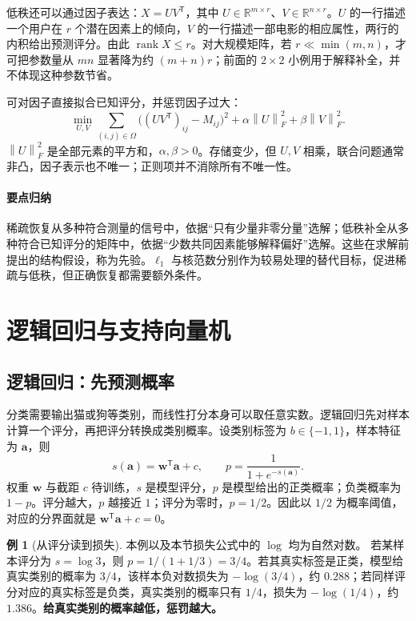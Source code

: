 \documentclass[UTF8,fontset=fandol,a4paper,12pt]{ctexart}
\newcommand{\R}{\mathbb R}
\newcommand{\rank}{\operatorname{rank}}
\newcommand{\va}{\boldsymbol a}
\newcommand{\vw}{\boldsymbol w}
\newcommand{\norm}[1]{\left\lVert#1\right\rVert}
\theoremstyle{definition}
\newtheorem{example}[definition]{例}
\begin{document}
低秩还可以通过因子表达：$X=UV^{\mathsf T}$，其中 $U\in\R^{m\times r}$、$V\in\R^{n\times r}$。$U$ 的一行描述一个用户在 $r$ 个潜在因素上的倾向，$V$ 的一行描述一部电影的相应属性，两行的内积给出预测评分。由此 $\rank X\le r$。对大规模矩阵，若 $r\ll\min(m,n)$，才可把参数量从 $mn$ 显著降为约 $(m+n)r$；前面的 $2\times2$ 小例用于解释补全，并不体现这种参数节省。

可对因子直接拟合已知评分，并惩罚因子过大：
\[
 \min_{U,V}\sum_{(i,j)\in\Omega}\bigl((UV^{\mathsf T})_{ij}-M_{ij}\bigr)^2
 +\alpha\norm{U}_F^2+\beta\norm{V}_F^2.
\]
$\norm{U}_F^2$ 是全部元素的平方和，$\alpha,\beta>0$。存储变少，但 $U,V$ 相乘，联合问题通常非凸，因子表示也不唯一；正则项并不消除所有不唯一性。

\paragraph{要点归纳}
稀疏恢复从多种符合测量的信号中，依据“只有少量非零分量”选解；低秩补全从多种符合已知评分的矩阵中，依据“少数共同因素能够解释偏好”选解。这些在求解前提出的结构假设，称为先验。$\ell_1$ 与核范数分别作为较易处理的替代目标，促进稀疏与低秩，但正确恢复都需要额外条件。

\section{逻辑回归与支持向量机}\label{sec:classification}
\subsection{逻辑回归：先预测概率}
分类需要输出猫或狗等类别，而线性打分本身可以取任意实数。逻辑回归先对样本计算一个评分，再把评分转换成类别概率。设类别标签为 $b\in\{-1,1\}$，样本特征为 $\va$，则
\[
 s(\va)=\vw^{\mathsf T}\va+c,\qquad
 p=\frac1{1+e^{-s(\va)}}.
\]
权重 $\vw$ 与截距 $c$ 待训练，$s$ 是模型评分，$p$ 是模型给出的正类概率；负类概率为 $1-p$。评分越大，$p$ 越接近 $1$；评分为零时，$p=1/2$。因此以 $1/2$ 为概率阈值，对应的分界面就是 $\vw^{\mathsf T}\va+c=0$。

\begin{example}[从评分读到损失]
本例以及本节损失公式中的 $\log$ 均为自然对数。
若某样本评分为 $s=\log3$，则 $p=1/(1+1/3)=3/4$。若其真实标签是正类，模型给真实类别的概率为 $3/4$，该样本负对数损失为 $-\log(3/4)$，约 $0.288$；若同样评分对应的真实标签是负类，真实类别的概率只有 $1/4$，损失为 $-\log(1/4)$，约 $1.386$。\textbf{给真实类别的概率越低，惩罚越大。}
\end{example}
\end{document}
